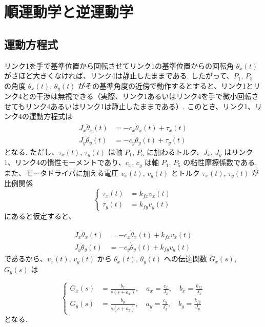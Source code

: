 \section{順運動学と逆運動学}

\subsection{運動方程式}

リンク1を手で基準位置から回転させてリンク1の基準位置からの回転角 $\theta_x(t)$ がさほど大きくなければ、リンク4は静止したままである.
したがって、$P_1$, $P_5$ の角度 $\theta_x(t)$, $\theta_y(t)$ がその基準角度の近傍で動作するとすると、リンク1とリンク4との干渉は無視できる（実際、リンク1あるいはリンク4を手で微小回転させてもリンク4あるいはリンク1は静止したままである）.
このとき、リンク1、リンク4の運動方程式は
\begin{equation}
\begin{aligned}
    J_x \ddot{\theta}_x(t) &= -c_x \dot{\theta}_x(t) + \tau_x(t) \\
    J_y \ddot{\theta}_y(t) &= -c_y \dot{\theta}_y(t) + \tau_y(t)
\end{aligned}
\label{eq:2.1}
\end{equation}
となる.
ただし、$\tau_x(t)$, $\tau_y(t)$ は軸 $P_1$, $P_5$ に加わるトルク、$J_x$, $J_y$ はリンク1、リンク4の慣性モーメントであり、$c_x$, $c_y$ は軸 $P_1$, $P_5$ の粘性摩擦係数である.
また、モータドライバに加える電圧 $v_x(t)$, $v_y(t)$ とトルク $\tau_x(t)$, $\tau_y(t)$ が比例関係
\begin{equation}
\left\{
\begin{aligned}
\tau_x(t) &= k_{fx} v_x(t) \\
\tau_y(t) &= k_{fy} v_y(t)
\end{aligned}
\right.
\label{eq:2.2}
\end{equation}
にあると仮定すると、

\begin{equation}
\begin{aligned}
    J_x \ddot{\theta}_x(t) &= -c_x \dot{\theta}_x(t) + k_{fx} v_x(t) \\
    J_y \ddot{\theta}_y(t) &= -c_y \dot{\theta}_y(t) + k_{fy} v_y(t)
\end{aligned}
\label{eq:2.3}
\end{equation}
であるから、$v_x(t)$, $v_y(t)$ から $\theta_x(t)$, $\theta_y(t)$ への伝達関数 $G_x(s)$, $G_y(s)$ は

\begin{equation}
\left\{
\begin{aligned}
G_x(s) &= \frac{b_x}{s(s+a_x)}, \quad a_x = \frac{c_x}{J_x}, \quad b_x = \frac{k_{fx}}{J_x} \\
G_y(s) &= \frac{b_y}{s(s+a_y)}, \quad a_y = \frac{c_y}{J_y}, \quad b_y = \frac{k_{fy}}{J_y}
\end{aligned}
\right.
\label{eq:2.4}
\end{equation}
となる.

